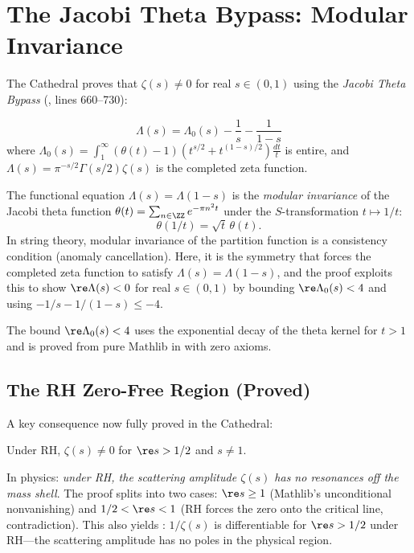 \section{The Jacobi Theta Bypass: Modular Invariance}
\label{sec:theta}

The Cathedral proves that $\zeta(s) \neq 0$ for real $s \in (0,1)$
using the \emph{Jacobi Theta Bypass} (, lines 660--730):

\[
  \Lambda(s) = \Lambda_0(s) - \frac{1}{s} - \frac{1}{1-s}
\]
where $\Lambda_0(s) = \int_1^\infty (\theta(t) - 1)(t^{s/2} + t^{(1-s)/2})\frac{dt}{t}$
is entire, and $\Lambda(s) = \pi^{-s/2}\Gamma(s/2)\zeta(s)$ is the
completed zeta function.

\begin{principle}
The functional equation $\Lambda(s) = \Lambda(1-s)$ is the
\emph{modular invariance} of the Jacobi theta function
$\theta(t) = \sum_{n \in \ZZ} e^{-\pi n^2 t}$ under the
$S$-transformation $t \mapsto 1/t$:
\[
  \theta(1/t) = \sqrt{t}\,\theta(t).
\]
In string theory, modular invariance of the partition function is a
consistency condition (anomaly cancellation). Here, it is the
symmetry that forces the completed zeta function to satisfy
$\Lambda(s) = \Lambda(1-s)$, and the proof exploits this to show
$\re\Lambda(s) < 0$ for real $s \in (0,1)$ by bounding
$\re\Lambda_0(s) < 4$ and using $-1/s - 1/(1-s) \leq -4$.
\end{principle}

The bound $\re\Lambda_0(s) < 4$ uses the exponential decay of the
theta kernel for $t > 1$ and is proved from pure Mathlib in
 with zero axioms.

\subsection{The RH Zero-Free Region (Proved)}

A key consequence now fully proved in the Cathedral:

\begin{theorem}
Under RH, $\zeta(s) \neq 0$ for $\re s > 1/2$ and $s \neq 1$.
\end{theorem}

In physics: \emph{under RH, the scattering amplitude $\zeta(s)$ has
no resonances off the mass shell}. The proof splits into two cases:
$\re s \geq 1$ (Mathlib's unconditional nonvanishing) and
$1/2 < \re s < 1$ (RH forces the zero onto the critical line,
contradiction). This also yields :
$1/\zeta(s)$ is differentiable for $\re s > 1/2$ under RH---the
scattering amplitude has no poles in the physical region.

